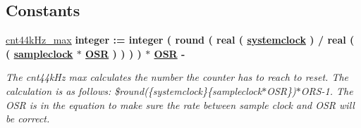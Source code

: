 \subsection*{Constants}
 \begin{DoxyCompactItemize}
\item 
\hypertarget{classclk__divide_1_1behavioral_a8f64c0dba167ef17ec71f04787ff5a8a}{\hyperlink{classclk__divide_1_1behavioral_a8f64c0dba167ef17ec71f04787ff5a8a}{cnt44k\-Hz\-\_\-max} {\bfseries \textcolor{comment}{integer}\textcolor{vhdlchar}{ }\textcolor{vhdlchar}{ }\textcolor{vhdlchar}{\-:}\textcolor{vhdlchar}{=}\textcolor{vhdlchar}{ }\textcolor{comment}{integer}\textcolor{vhdlchar}{ }\textcolor{vhdlchar}{(}\textcolor{vhdlchar}{ }\textcolor{vhdlchar}{ }\textcolor{vhdlchar}{round}\textcolor{vhdlchar}{ }\textcolor{vhdlchar}{(}\textcolor{vhdlchar}{ }\textcolor{vhdlchar}{ }\textcolor{comment}{real}\textcolor{vhdlchar}{ }\textcolor{vhdlchar}{(}\textcolor{vhdlchar}{ }\textcolor{vhdlchar}{ }{\bfseries \hyperlink{classclk__divide_a81d31886de4b5afc05873543265dcf7c}{systemclock}} \textcolor{vhdlchar}{ }\textcolor{vhdlchar}{)}\textcolor{vhdlchar}{ }\textcolor{vhdlchar}{ }\textcolor{vhdlchar}{/}\textcolor{vhdlchar}{ }\textcolor{comment}{real}\textcolor{vhdlchar}{ }\textcolor{vhdlchar}{(}\textcolor{vhdlchar}{ }\textcolor{vhdlchar}{ }\textcolor{vhdlchar}{(}\textcolor{vhdlchar}{ }{\bfseries \hyperlink{classclk__divide_a046b87df8ce0a99f5bacf19e5027cccf}{sampleclock}} \textcolor{vhdlchar}{ }\textcolor{vhdlchar}{$\ast$}\textcolor{vhdlchar}{ }{\bfseries \hyperlink{classclk__divide_aeab4f828c7bc0927792f6a9c6bf1b63f}{O\-S\-R}} \textcolor{vhdlchar}{ }\textcolor{vhdlchar}{)}\textcolor{vhdlchar}{ }\textcolor{vhdlchar}{ }\textcolor{vhdlchar}{)}\textcolor{vhdlchar}{ }\textcolor{vhdlchar}{ }\textcolor{vhdlchar}{)}\textcolor{vhdlchar}{ }\textcolor{vhdlchar}{ }\textcolor{vhdlchar}{)}\textcolor{vhdlchar}{ }\textcolor{vhdlchar}{ }\textcolor{vhdlchar}{$\ast$}\textcolor{vhdlchar}{ }{\bfseries \hyperlink{classclk__divide_aeab4f828c7bc0927792f6a9c6bf1b63f}{O\-S\-R}} \textcolor{vhdlchar}{ }\textcolor{vhdlchar}{-\/}\textcolor{vhdlchar}{ }} }\label{classclk__divide_1_1behavioral_a8f64c0dba167ef17ec71f04787ff5a8a}

\begin{DoxyCompactList}\small\item\em The cnt44k\-Hz max calculates the number the counter has to reach to reset. The calculation is as follows\-: \$round(\{systemclock\}\{sampleclock$\ast$\-O\-S\-R\})$\ast$\-O\-R\-S-\/1. The O\-S\-R is in the equation to make sure the rate between sample clock and O\-S\-R will be correct. \end{DoxyCompactList}\end{DoxyCompactItemize}
